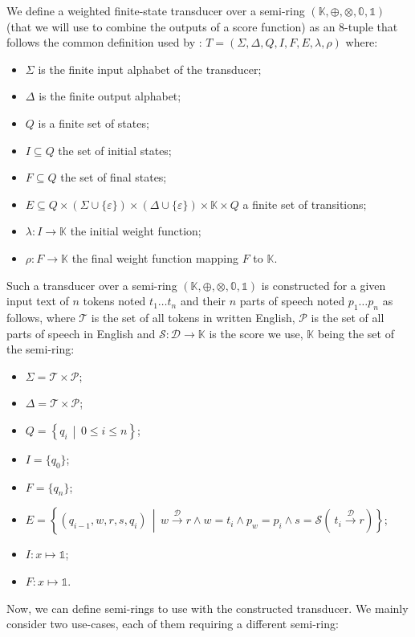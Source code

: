 \documentclass[a4paper, 11pt, onepage]{scrreprt}
\newcommand\maps[1]{\xrightarrow{\mathcal{#1}}}
\newcommand\suchthat{\, \middle| \,}
\begin{document}
We define a weighted finite-state transducer over a semi-ring
$(\mathbb{K}, \oplus, \otimes, \mathbb{0}, \mathbb{1})$ (that we will
use to combine the outputs of a score function) as an 8-tuple that
follows the common definition used by \cite{mohri2004weighted}: $T =
(\Sigma, \Delta, Q, I, F, E, \lambda, \rho)$ where:
\begin{itemize}
\item $\Sigma$ is the finite input alphabet of the transducer;
\item $\Delta$ is the finite output alphabet;
\item $Q$ is a finite set of states;
\item $I \subseteq Q$ the set of initial states;
\item $F \subseteq Q$ the set of final states;
\item $E \subseteq Q \times (\Sigma \cup \{\varepsilon\}) \times
  (\Delta \cup \{\varepsilon\}) \times \mathbb{K} \times Q$ a finite
  set of transitions;
\item $λ : I \rightarrow \mathbb{K}$ the initial weight function;
\item $ρ : F \rightarrow \mathbb{K}$ the final weight function mapping
  $F$ to $\mathbb{K}$.
\end{itemize}
Such a transducer over a semi-ring $(\mathbb{K}, \oplus, \otimes,
\mathbb{0}, \mathbb{1})$ is constructed for a given input text of $n$
tokens noted $t_1 \dots t_n$ and their $n$ parts of speech noted $p_1
\dots p_n$ as follows, where $\mathcal{T}$ is the set of all tokens in
written English, $\mathcal{P}$ is the set of all parts of speech in
English and $\mathcal{S} : \mathcal{D} \rightarrow \mathbb{K}$ is the
score we use, $\mathbb{K}$ being the set of the semi-ring:
\begin{itemize}
\item $\Sigma = \mathcal{T} \times \mathcal{P}$;
\item $\Delta = \mathcal{T} \times \mathcal{P}$;
\item $Q = \left\{ q_i \suchthat 0 \leq i \leq n \right\}$;
\item $I = \{ q_0 \}$;
\item $F = \{ q_n \}$;
\item $E = \left\{ (q_{i - 1}, w, r, s, q_i) \suchthat w \maps{D} r
    \land w = t_i \land p_w = p_i \land s = \mathcal{S}\left(\ t_i
      \maps{D} r \right)\right\}$;
\item $I : x \mapsto \mathbb{1}$;
\item $F : x \mapsto \mathbb{1}$.
\end{itemize}
Now, we can define semi-rings to use with the constructed
transducer. We mainly consider two use-cases, each of them requiring a
different semi-ring:
\end{document}

